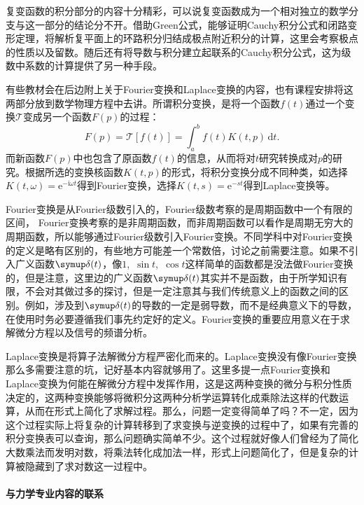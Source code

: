 复变函数的积分部分的内容十分精彩，可以说复变函数成为一个相对独立的数学分支与这一部分的结论分不开。借助Green公式，能够证明Cauchy积分公式和闭路变形定理，将解析复平面上的环路积分归结成极点附近积分的计算，这里会考察极点的性质以及留数。随后还有将导数与积分建立起联系的Cauchy积分公式，这为级数中系数的计算提供了另一种手段。

有些教材会在后边附上关于Fourier变换和Laplace变换的内容，也有课程安排将这两部分放到数学物理方程中去讲。所谓积分变换，是将一个函数$f(t)$通过一个变换$\mathscr{T}$变成另一个函数$F(p)$的过程：
\[
	F\left( p \right) =\mathscr{T}\left[ f\left( t \right) \right] =\int_a^b{f\left( t \right) K\left( t,p \right) \,\mathrm{d}t}.
\]
而新函数$F(p)$中也包含了原函数$f(t)$的信息，从而将对$t$研究转换成对$p$的研究。根据所选的变换核函数$K(t,p)$的形式，将积分变换分成不同种类，如选择$K(t,\omega)=\mathrm{e}^{-\mathrm{i}\omega t}$得到Fourier变换，选择$K(t,s)=\mathrm{e}^{-st}$得到Laplace变换等。

Fourier变换是从Fourier级数引入的，Fourier级数考察的是周期函数中一个有限的区间， Fourier变换考察的是非周期函数，而非周期函数可以看作是周期无穷大的周期函数，所以能够通过Fourier级数引入Fourier变换。不同学科中对Fourier变换的定义是略有区别的，有些地方可能差一个常数倍，讨论之前需要注意。如果不引入广义函数$\symup\delta(t)$，像$1$,~$\sin t$,~$\cos t$这样简单的函数都是没法做Fourier变换的，但是注意，这里边的广义函数$\symup\delta(t)$其实并不是函数，由于所学知识有限，不会对其做过多的探讨，但是一定注意其与我们传统意义上的函数之间的区别。例如，涉及到$\symup\delta(t)$的导数的一定是弱导数，而不是经典意义下的导数，在使用时务必要遵循我们事先约定好的定义。Fourier变换的重要应用意义在于求解微分方程以及信号的频谱分析。

Laplace变换是将算子法解微分方程严密化而来的。Laplace变换没有像Fourier变换那么多需要注意的坑，记好基本内容就够用了。这里多提一点Fourier变换和Laplace变换为何能在解微分方程中发挥作用，这是这两种变换的微分与积分性质决定的，这两种变换能够将微积分这两种分析学运算转化成乘除法这样的代数运算，从而在形式上简化了求解过程。那么，问题一定变得简单了吗？不一定，因为这个过程实际上将复杂的计算转移到了求变换与逆变换的过程中了，如果有完善的积分变换表可以查询，那么问题确实简单不少。这个过程就好像人们曾经为了简化大数乘法而发明对数，将乘法转化成加法一样，形式上问题简化了，但是复杂的计算被隐藏到了求对数这一过程中。

\paragraph{与力学专业内容的联系}

